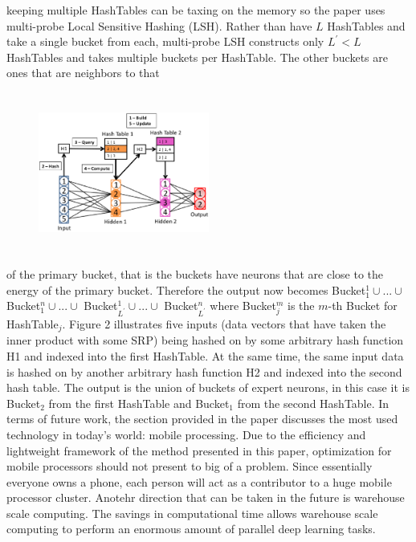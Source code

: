 \documentclass[12pt]{article}
\theoremstyle{remark}
\begin{document}
keeping multiple HashTables can be taxing on the memory so the paper uses multi-probe Local Sensitive Hashing (LSH). Rather than have $L$ HashTables and take a single bucket from each, multi-probe LSH constructs only $L^\prime < L$ HashTables and takes multiple buckets per HashTable. The other buckets are ones that are neighbors to that 
\begin{figure}
	\vspace{-15pt}
	\hspace{0pt}
	\includegraphics[height=5.25cm,width=0.5\textwidth]{Figure2.eps}
	\caption{}
	\vspace{-20pt}
\end{figure}
of the primary bucket, that is the buckets have neurons that are close to the energy of the primary bucket. Therefore the output now becomes Bucket$_1^1 \cup ... \cup$ Bucket$_1^n \cup ... \cup$ Bucket$_{L^\prime}^1 \cup ... \cup$ Bucket$_{L^\prime}^n$ where Bucket$_j^m$ is the $m$-th Bucket for HashTable$_j$. Figure 2 illustrates five inputs (data vectors that have taken the inner product with some SRP) being hashed on by some arbitrary hash function H1 and indexed into the first HashTable. At the same time, the same input data is hashed on by another arbitrary hash function H2 and indexed into the second hash table. The output is the union of buckets of expert neurons, in this case it is Bucket$_2$ from the first HashTable and Bucket$_1$ from the second HashTable. In terms of future work, the section provided in the paper discusses the most used technology in today's world: mobile processing. Due to the efficiency and lightweight framework of the method presented in this paper, optimization for mobile processors should not present to big of a problem. Since essentially everyone owns a phone, each person will act as a contributor to a huge mobile processor cluster. Anotehr direction that can be taken in the future is warehouse scale computing. The savings in computational time allows warehouse scale computing to perform an enormous amount of parallel deep learning tasks. \\
\end{document}
